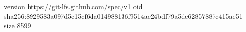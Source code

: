 version https://git-lfs.github.com/spec/v1
oid sha256:8929583a097d5c15cf6da014988136f9514ae24bdf79a5dc62857887c415ae51
size 8599
